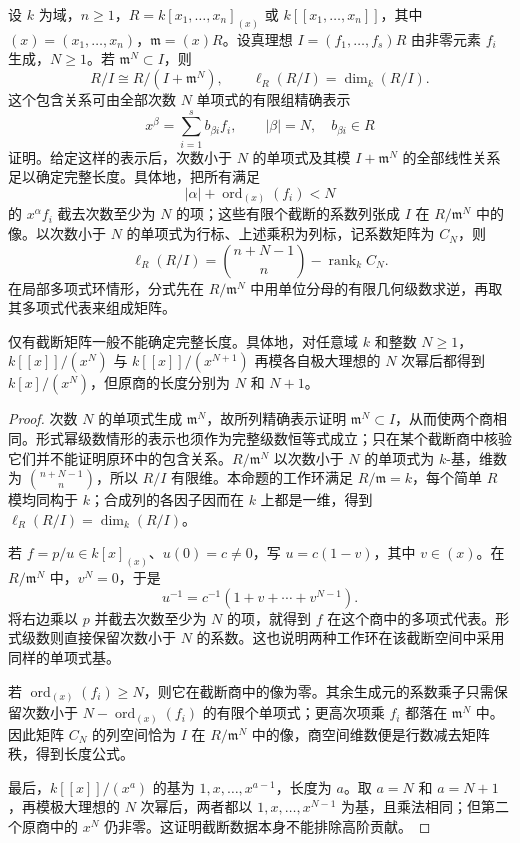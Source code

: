 \begin{proposition}\label{b3:prop:F-truncation-length}\label{b3:prop:F-truncation-insufficient}
	设 \(k\) 为域，\(n\ge1\)，\(R=k[x_1,\ldots,x_n]_{(x)}\) 或 \(k[\![x_1,\ldots,x_n]\!]\)，其中 \((x)=(x_1,\ldots,x_n)\)，\(\mathfrak m=(x)R\)。设真理想 \(I=(f_1,\ldots,f_s)R\) 由非零元素 \(f_i\) 生成，\(N\ge1\)。若 \(\mathfrak m^N\subset I\)，则
	\[
		R/I\cong R/(I+\mathfrak m^N), \qquad \ell_R(R/I)=\dim_k(R/I).
	\]
	这个包含关系可由全部次数 \(N\) 单项式的有限组精确表示
	\[
		x^\beta=\sum_{i=1}^s b_{\beta i}f_i, \qquad |\beta|=N,\quad b_{\beta i}\in R
	\]
	证明。给定这样的表示后，次数小于 \(N\) 的单项式及其模 \(I+\mathfrak m^N\) 的全部线性关系足以确定完整长度。具体地，把所有满足
	\[
		|\alpha|+\operatorname{ord}_{(x)}(f_i)<N
	\]
	的 \(x^\alpha f_i\) 截去次数至少为 \(N\) 的项；这些有限个截断的系数列张成 \(I\) 在 \(R/\mathfrak m^N\) 中的像。以次数小于 \(N\) 的单项式为行标、上述乘积为列标，记系数矩阵为 \(C_N\)，则
	\[
		\ell_R(R/I)=\binom{n+N-1}{n}-\operatorname{rank}_k C_N.
	\]
	在局部多项式环情形，分式先在 \(R/\mathfrak m^N\) 中用单位分母的有限几何级数求逆，再取其多项式代表来组成矩阵。

	仅有截断矩阵一般不能确定完整长度。具体地，对任意域 \(k\) 和整数 \(N\ge1\)，\(k[\![x]\!]/(x^N)\) 与 \(k[\![x]\!]/(x^{N+1})\) 再模各自极大理想的 \(N\) 次幂后都得到 \(k[x]/(x^N)\)，但原商的长度分别为 \(N\) 和 \(N+1\)。
\end{proposition}
\begin{proof}
	次数 \(N\) 的单项式生成 \(\mathfrak m^N\)，故所列精确表示证明 \(\mathfrak m^N\subset I\)，从而使两个商相同。形式幂级数情形的表示也须作为完整级数恒等式成立；只在某个截断商中核验它们并不能证明原环中的包含关系。\(R/\mathfrak m^N\) 以次数小于 \(N\) 的单项式为 \(k\)-基，维数为 \(\binom{n+N-1}{n}\)，所以 \(R/I\) 有限维。本命题的工作环满足 \(R/\mathfrak m=k\)，每个简单 \(R\) 模均同构于 \(k\)；合成列的各因子因而在 \(k\) 上都是一维，得到 \(\ell_R(R/I)=\dim_k(R/I)\)。

	若 \(f=p/u\in k[x]_{(x)}\)、\(u(0)=c\ne0\)，写 \(u=c(1-v)\)，其中 \(v\in(x)\)。在 \(R/\mathfrak m^N\) 中，\(v^N=0\)，于是
	\[
		u^{-1}=c^{-1}(1+v+\cdots+v^{N-1}).
	\]
	将右边乘以 \(p\) 并截去次数至少为 \(N\) 的项，就得到 \(f\) 在这个商中的多项式代表。形式级数则直接保留次数小于 \(N\) 的系数。这也说明两种工作环在该截断空间中采用同样的单项式基。

	若 \(\operatorname{ord}_{(x)}(f_i)\ge N\)，则它在截断商中的像为零。其余生成元的系数乘子只需保留次数小于 \(N-\operatorname{ord}_{(x)}(f_i)\) 的有限个单项式；更高次项乘 \(f_i\) 都落在 \(\mathfrak m^N\) 中。因此矩阵 \(C_N\) 的列空间恰为 \(I\) 在 \(R/\mathfrak m^N\) 中的像，商空间维数便是行数减去矩阵秩，得到长度公式。

	最后，\(k[\![x]\!]/(x^a)\) 的基为 \(1,x,\ldots,x^{a-1}\)，长度为 \(a\)。取 \(a=N\) 和 \(a=N+1\)，再模极大理想的 \(N\) 次幂后，两者都以 \(1,x,\ldots,x^{N-1}\) 为基，且乘法相同；但第二个原商中的 \(x^N\) 仍非零。这证明截断数据本身不能排除高阶贡献。
\end{proof}

